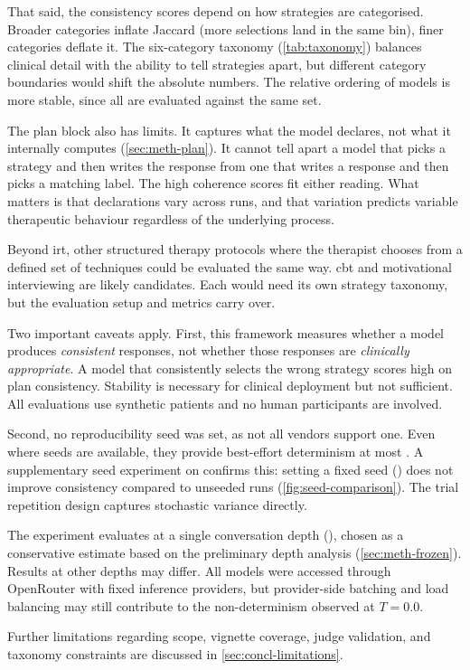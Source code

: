 That said, the consistency scores depend on how strategies are
categorised. Broader categories inflate Jaccard (more selections land in
the same bin), finer categories deflate it. The six-category taxonomy
(\autoref{tab:taxonomy}) balances clinical detail with the ability to
tell strategies apart, but different category boundaries would shift the
absolute numbers. The relative ordering of models is more stable, since
all are evaluated against the same set.

The plan block also has limits. It captures what the model declares, not
what it internally computes (\autoref{sec:meth-plan}). It cannot tell
apart a model that picks a strategy and then writes the response from one
that writes a response and then picks a matching label. The high
coherence scores fit either reading. What matters is that declarations
vary across runs, and that variation predicts variable therapeutic
behaviour regardless of the underlying process.

Beyond \gls{irt}, other structured therapy
protocols where the therapist chooses from a defined set of techniques
could be evaluated the same way. \gls{cbt} and motivational interviewing
are likely candidates. Each would need its own strategy taxonomy, but the
evaluation setup and metrics carry over.

Two important caveats apply. First, this framework measures whether a
model produces \emph{consistent} responses, not whether those responses
are \emph{clinically appropriate}. A model that consistently selects the
wrong strategy scores high on plan consistency. Stability is necessary
for clinical deployment but not sufficient. All evaluations use synthetic
patients and no human participants are involved.

Second, no reproducibility seed was set, as not all vendors support one.
Even where seeds are available, they provide best-effort determinism at
most \parencite{HITR7PL4}. A supplementary seed experiment on
 confirms this: setting a fixed seed
() does not improve consistency compared to unseeded runs
(\autoref{fig:seed-comparison}). The trial repetition design captures
stochastic variance directly.

The experiment evaluates at a single conversation depth
(), chosen as a conservative estimate based on the
preliminary depth analysis (\autoref{sec:meth-frozen}). Results at other
depths may differ. All models were accessed through OpenRouter with fixed
inference providers, but provider-side batching and load balancing may
still contribute to the non-determinism observed at $T = 0.0$.

Further limitations regarding scope, vignette coverage, judge validation,
and taxonomy constraints are discussed in \autoref{sec:concl-limitations}.
